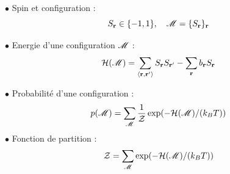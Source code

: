 \documentclass[9pt]{beamer}
\begin{document}
\begin{frame}
\begin{multicols}{2}
$\bullet$ Spin et configuration :
\begin{equation*}
 S_{\bf r} \in \{-1,1\}, \quad \mathscr{M} = \{S_{\bf r}\}_{\bf r}
\end{equation*}

$\bullet$ Energie d'une configuration $\mathscr{M}$ :
\begin{equation*}
 \mathcal{H}(\mathscr{M}) = \sum_{\left< {\bf r}, {\bf r}' \right>} S_{\bf r} S_{{\bf r}'} - \sum_{\bf r} b_{\bf r} S_{\bf r}	
\end{equation*}

$\bullet$ Probabilité d'une configuration :
\begin{equation*}
p(\mathscr{M}) = \sum_{\mathscr{M}} \frac{1}{\mathcal{Z}} \exp(-\mathcal{H}(\mathscr{M})/(k_BT))
\end{equation*}
$\bullet$ Fonction de partition :
\begin{equation*}
\mathcal{Z} = \sum_{\mathscr{M}}  \exp(-\mathcal{H}(\mathscr{M})/(k_BT))
\end{equation*}

	\end{multicols}
\end{frame}
\end{document}
